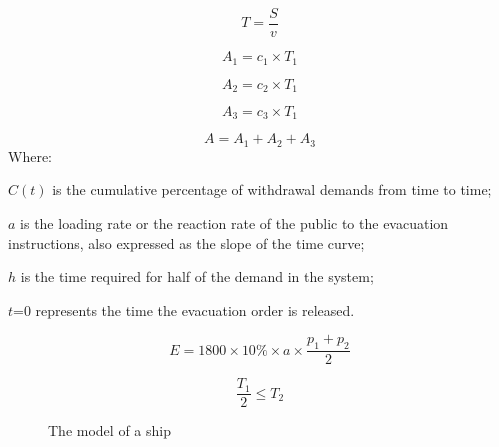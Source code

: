 \documentclass{mcmthesis}
\begin{document}
\begin{equation}\label{5}
T=\frac{S}{v}
\end{equation}

\begin{equation}\label{5}
A_1=c_1 \times T_1
\end{equation}

\begin{equation}\label{6}
A_2=c_2  \times T_1
\end{equation}

\begin{equation}\label{7}
A_3=c_3  \times T_1
\end{equation}

\begin{equation}\label{8}
A=A_1+A_2+A_3
\end{equation}
Where:

$C(t)$ is the cumulative percentage of withdrawal demands from time to time;

$a$ is the loading rate or the reaction rate of the public to the evacuation instructions, also expressed as the slope of the time curve;

$h$ is the time required for half of the demand in the system;

$t$=0 represents the time the evacuation order is released.



\begin{equation}\label{9}
E=1800 \times 10\% \times a \times \frac{p_1+p_2}{2}
\end{equation}


\begin{equation}\label{10}
\frac{T_1}{2}\leq T_2
\end{equation}

\begin{figure}[tbp]
  \caption{The model of a ship}\label{figure1}
\end{figure}
 
\end{document}
